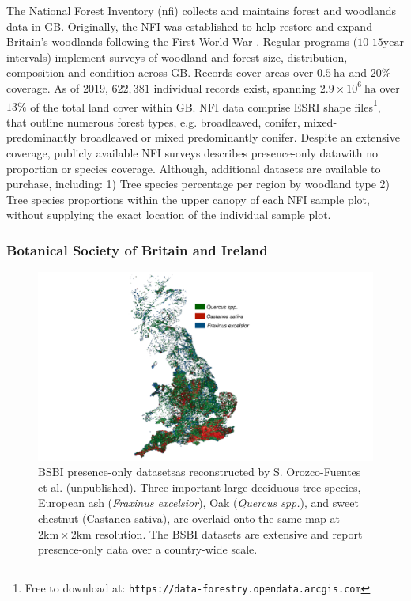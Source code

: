 The National Forest Inventory (\acrshort{nfi}) collects and maintains forest and woodlands data in GB.
Originally, the NFI was established to help restore and expand Britain's woodlands following the First World War \cite{james1990history}.
Regular programs ($10$-$15\mathrm{year}$ intervals) implement surveys of woodland and forest size, distribution, composition and condition across GB.
Records cover areas over $0.5\ \mathrm{ha}$ and $20\%$ coverage.
As of $2019$, $622,381$ individual records exist, spanning $2.9 \times 10^6\ \mathrm{ha}$ over $13\%$ of the total land cover within GB.
NFI data comprise ESRI shape files\footnote{
Free to download at: \nolinkurl{https://data-forestry.opendata.arcgis.com}},
that outline numerous forest types, e.g. broadleaved, conifer, mixed-predominantly broadleaved or mixed predominantly conifer.
Despite an extensive coverage, publicly available NFI surveys describes presence-only data\textemdash with no proportion or species coverage.
Although, additional datasets are available to purchase, including: 
1) Tree species percentage per region by woodland type
2) Tree species proportions within the upper canopy of each NFI sample plot, without supplying the exact location of the individual sample plot.

\subsubsection{Botanical Society of Britain and Ireland}

\begin{figure}
    \centering
    \includegraphics[scale=0.25]{chapter2/figures/bsbi-data.pdf}
    \caption{BSBI presence-only datasets\textemdash as reconstructed by S. Orozco-Fuentes et al. (unpublished).
    Three important large deciduous tree species, European ash (\textit{Fraxinus excelsior}), 
    Oak (\textit{Quercus spp.}), and sweet chestnut (Castanea sativa), are overlaid onto the same map at $\mathrm{2km \times 2km}$ resolution.
    The BSBI datasets are extensive and report presence-only data over a country-wide scale.
    }
    \label{fig:bsbi-data}
\end{figure}

